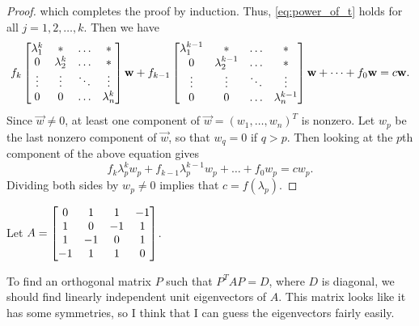 \documentclass{homework}
\begin{document}
\begin{proof}
		which completes the proof by induction. Thus, \eqref{eq:power_of_t} holds for all $j=1,2,\dots,k$. Then we have
		\begin{equation*}
			f_k\left[\begin{matrix}\lambda_1^k & * & \hdots & * \\ 0 & \lambda_2^k & \hdots & * \\ \vdots & \vdots & \ddots & \vdots \\ 0 & 0 & \hdots & \lambda_n^k\end{matrix}\right]\mathbf{w} + f_{k-1}\left[\begin{matrix}\lambda_1^{k-1} & * & \hdots & * \\ 0 & \lambda_2^{k-1} & \hdots & * \\ \vdots & \vdots & \ddots & \vdots \\ 0 & 0 & \hdots & \lambda_n^{k-1}\end{matrix}\right]\mathbf{w} + \dots + f_0\mathbf{w} = c\mathbf{w}.
		\end{equation*}
		Since $\vec{w} \ne 0$, at least one component of $\vec{w} = (w_1, \dots, w_n)^T$ is nonzero. Let $w_p$ be the last nonzero component of $\vec{w}$, so that $w_q = 0$ if $q > p$. Then looking at the $p$th component of the above equation gives
		\begin{equation*}
			f_k\lambda_p^kw_p + f_{k-1}\lambda_p^{k-1}w_p + \dots +f_0w_p = cw_p.
		\end{equation*}
		Dividing both sides by $w_p \ne 0$ implies that $c = f(\lambda_p)$.
	\end{proof}
	
	\question Let $A = \left[\begin{matrix}0 & 1 & 1 & -1 \\ 1 & 0 & -1 & 1 \\ 1 & -1 & 0 & 1 \\ -1 & 1 & 1 & 0\end{matrix}\right]$.
	
	To find an orthogonal matrix $P$ such that $P^TAP = D$, where $D$ is diagonal, we should find linearly independent unit eigenvectors of $A$. This matrix looks like it has some symmetries, so I think that I can guess the eigenvectors fairly easily.
	
\end{document}
